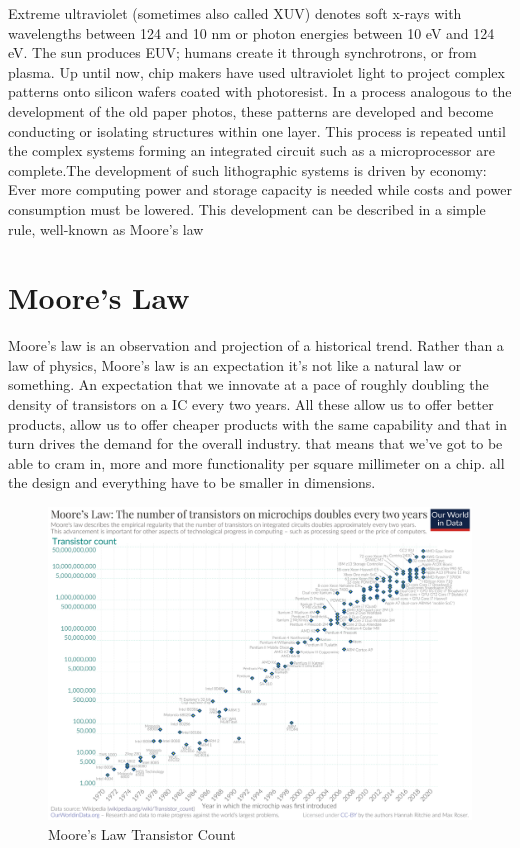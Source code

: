 \documentclass[12pt,a4paper]{report}
\begin{document}
Extreme ultraviolet (sometimes also called XUV) denotes 
soft x-rays with wavelengths between 124 and 10 nm or
 photon energies between 10 eV and 124 eV. 
 The sun produces EUV; humans create it through 
 synchrotrons, or from plasma.
Up until now, chip makers have used ultraviolet light to 
project complex patterns onto
 silicon wafers coated with photoresist. In a process 
 analogous to the development of the old paper photos, 
 these patterns are developed and become conducting or 
 isolating structures within one layer. This process is 
 repeated until the complex systems forming an 
 integrated circuit such as a microprocessor are 
 complete.The development of such lithographic systems is 
driven by economy: Ever more computing power 
and storage capacity is needed while costs and 
power consumption must be lowered. 
This development can be described in a simple rule, 
well-known as Moore’s law

\section{Moore's Law}
Moore's law is an observation and projection of a 
historical trend. Rather than a law 
of physics, Moore's law is an expectation it's 
not like a natural law or something. An expectation 
that we innovate at a pace of roughly doubling 
the density of transistors on a IC every two years.
All these allow us to 
offer better products, allow us to offer cheaper 
products with the same capability and that in 
turn drives the demand for the overall industry. 
that means that we've got to be able to cram in, 
more and more
functionality per square millimeter on a chip. all 
the design and everything have to be smaller in dimensions.


\begin{figure}
  \centering
  \includegraphics[scale=0.3]{Moore's_Law_Transistor_Count.png}
  \caption{Moore's Law Transistor Count}
  \label{moores}
  \end{figure}
\end{document}
